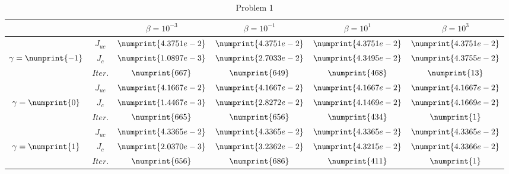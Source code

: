 \begin{table}
\begin{tabular}{ ||c|| c | c | c | c | c ||}
\hline
& & $\beta = 10^{-3}$ & $\beta = 10^{-1}$ & $\beta = 10^{1}$ & $\beta = 10^{3}$  \\
\hline
 & $J_{uc}$ & $\numprint{4.3751e-2}$ & $\numprint{4.3751e-2}$ & $\numprint{4.3751e-2}$ & $\numprint{4.3751e-2}$ \\
$\gamma= \numprint{-1}$  & $J_c$ & $\numprint{1.0897e-3}$ & $\numprint{2.7033e-2}$ & $\numprint{4.3495e-2}$ & $\numprint{4.3755e-2}$ \\
& $Iter.$ & $\numprint{667}$ & $\numprint{649}$ & $\numprint{468}$ & $\numprint{13}$ \\
\hline
 & $J_{uc}$ & $\numprint{4.1667e-2}$ & $\numprint{4.1667e-2}$ & $\numprint{4.1667e-2}$ & $\numprint{4.1667e-2}$ \\
$\gamma= \numprint{0}$  & $J_c$ & $\numprint{1.4467e-3}$ & $\numprint{2.8272e-2}$ & $\numprint{4.1469e-2}$ & $\numprint{4.1669e-2}$ \\
& $Iter.$ & $\numprint{665}$ & $\numprint{656}$ & $\numprint{434}$ & $\numprint{1}$ \\
\hline
 & $J_{uc}$ & $\numprint{4.3365e-2}$ & $\numprint{4.3365e-2}$ & $\numprint{4.3365e-2}$ & $\numprint{4.3365e-2}$ \\
$\gamma= \numprint{1}$  & $J_c$ & $\numprint{2.0370e-3}$ & $\numprint{3.2362e-2}$ & $\numprint{4.3215e-2}$ & $\numprint{4.3366e-2}$ \\
& $Iter.$ & $\numprint{656}$ & $\numprint{686}$ & $\numprint{411}$ & $\numprint{1}$ \\
\hline
\end{tabular}
\caption{Problem 1}
\label{TabS5:Prob1}
\end{table}